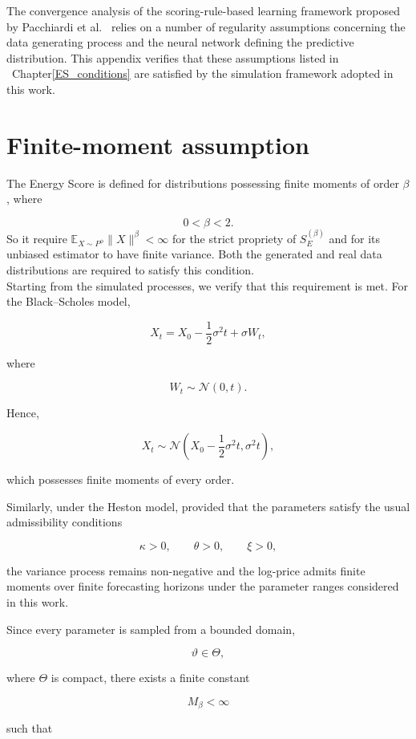 \begin{appendices}
The convergence analysis of the scoring-rule-based learning framework proposed by Pacchiardi et al.~\cite{srforgan:srforgan} 
relies on a number of regularity assumptions 
concerning the data generating process and the 
neural network defining the predictive distribution. 
This appendix verifies that these assumptions listed in ~Chapter\ref{ES_conditions} are satisfied by the simulation framework adopted in this work.



\section{Finite-moment assumption}
The Energy Score is defined for distributions possessing finite moments of order $\beta$, where

\[
0<\beta<2.
\]
So it require $\mathbb{E}_{X\sim P^\phi}\|X\|^\beta<\infty$ for the strict propriety of $S_E^{(\beta)}$ and for its unbiased estimator to have finite variance.
Both the generated and real data distributions are required to satisfy this condition.\\

Starting from the simulated processes, we verify that this requirement is met.
For the Black--Scholes model,

\[
X_t
=
X_0
-
\frac12\sigma^2t
+
\sigma W_t,
\]

where

\[
W_t
\sim
\mathcal N(0,t).
\]

Hence,

\[
X_t
\sim
\mathcal N
\left(
X_0-\frac12\sigma^2t,
\sigma^2t
\right),
\]

which possesses finite moments of every order.

Similarly, under the Heston model, provided that the parameters satisfy the usual admissibility conditions

\[
\kappa>0,\qquad
\theta>0,\qquad
\xi>0,
\]

the variance process remains non-negative and the log-price admits finite moments over finite forecasting horizons under the parameter ranges considered in this work.

Since every parameter is sampled from a bounded domain,

\[
\vartheta\in\Theta,
\]

where $\Theta$ is compact, there exists a finite constant

\[
M_\beta<\infty
\]

such that


\end{appendices}
